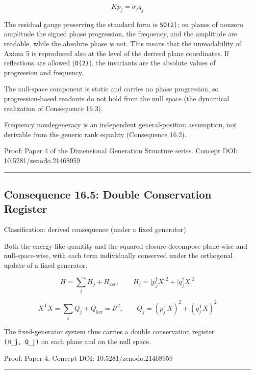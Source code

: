 \documentclass[
  a4paper,
]{article}
\begin{document}
\[
Kp_j=\sigma_j q_j
\]

The residual gauge preserving the standard form is \texttt{SO(2)}; on
planes of nonzero amplitude the signed phase progression, the frequency,
and the amplitude are readable, while the absolute phase is not. This
means that the unreadability of Axiom 5 is reproduced also at the level
of the derived plane coordinates. If reflections are allowed
(\texttt{O(2)}), the invariants are the absolute values of progression
and frequency.

The null-space component is static and carries no phase progression, so
progression-based readouts do not hold from the null space (the
dynamical realization of Consequence 16.3).

Frequency nondegeneracy is an independent general-position assumption,
not derivable from the generic rank equality (Consequence 16.2).

Proof: Paper 4 of the Dimensional Generation Structure series. Concept
DOI: 10.5281/zenodo.21468959

\begin{center}\rule{0.5\linewidth}{0.5pt}\end{center}

\subsection{Consequence 16.5: Double Conservation
Register}\label{consequence-16.5-double-conservation-register}

Classification: derived consequence (under a fixed generator)

Both the energy-like quantity and the squared closure decompose
plane-wise and null-space-wise, with each term individually conserved
under the orthogonal update of a fixed generator.

\[
H=\sum_{j}H_j+H_{\ker},
\qquad
H_j=\lvert p_j^\dagger X\rvert^2+\lvert q_j^\dagger X\rvert^2
\]

\[
X^{\mathsf T}X=\sum_{j}Q_j+Q_{\ker}=R^2,
\qquad
Q_j=(p_j^{\mathsf T}X)^2+(q_j^{\mathsf T}X)^2
\]

The fixed-generator system thus carries a double conservation register
\texttt{(H\_j,\ Q\_j)} on each plane and on the null space.

Proof: Paper 4. Concept DOI: 10.5281/zenodo.21468959

\begin{center}\rule{0.5\linewidth}{0.5pt}\end{center}
\end{document}
